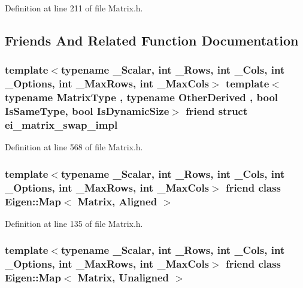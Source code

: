 Definition at line 211 of file Matrix.\-h.



\subsection{Friends And Related Function Documentation}
\hypertarget{class_matrix_a6aa443d64e3eddedd334b47526dd3d55}{
\subsubsection[{ei\-\_\-matrix\-\_\-swap\-\_\-impl}]{\setlength{\rightskip}{0pt plus 5cm}template$<$typename \-\_\-\-Scalar, int \-\_\-\-Rows, int \-\_\-\-Cols, int \-\_\-\-Options, int \-\_\-\-Max\-Rows, int \-\_\-\-Max\-Cols$>$ template$<$typename Matrix\-Type , typename Other\-Derived , bool Is\-Same\-Type, bool Is\-Dynamic\-Size$>$ friend {\bf struct} {\bf ei\-\_\-matrix\-\_\-swap\-\_\-impl}\hspace{0.3cm}{\ttfamily [friend]}}}\label{class_matrix_a6aa443d64e3eddedd334b47526dd3d55}


Definition at line 568 of file Matrix.\-h.

\hypertarget{class_matrix_a26bfc15b405d2f93f168b19fd68b7441}{
\subsubsection[{Eigen\-::\-Map$<$ Matrix, Aligned $>$}]{\setlength{\rightskip}{0pt plus 5cm}template$<$typename \-\_\-\-Scalar, int \-\_\-\-Rows, int \-\_\-\-Cols, int \-\_\-\-Options, int \-\_\-\-Max\-Rows, int \-\_\-\-Max\-Cols$>$ friend class Eigen\-::\-Map$<$ {\bf Matrix}, {\bf Aligned} $>$\hspace{0.3cm}{\ttfamily [friend]}}}\label{class_matrix_a26bfc15b405d2f93f168b19fd68b7441}


Definition at line 135 of file Matrix.\-h.

\hypertarget{class_matrix_a1322812c8fab9e467c90dc8df08bf7dd}{
\subsubsection[{Eigen\-::\-Map$<$ Matrix, Unaligned $>$}]{\setlength{\rightskip}{0pt plus 5cm}template$<$typename \-\_\-\-Scalar, int \-\_\-\-Rows, int \-\_\-\-Cols, int \-\_\-\-Options, int \-\_\-\-Max\-Rows, int \-\_\-\-Max\-Cols$>$ friend class Eigen\-::\-Map$<$ {\bf Matrix}, {\bf Unaligned} $>$\hspace{0.3cm}{\ttfamily [friend]}}}\label{class_matrix_a1322812c8fab9e467c90dc8df08bf7dd}


